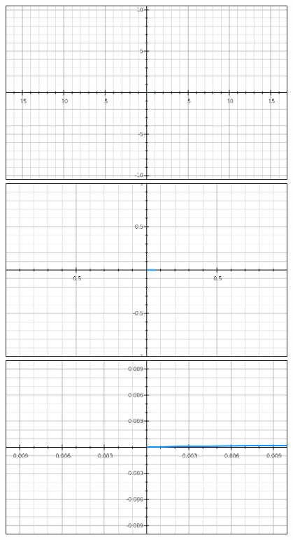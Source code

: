 \documentclass[aspectratio=149]{beamer}
\begin{document}
\begin{frame}
\begin{columns}
\begin{column}{0.5\textwidth}
			\end{column}
			\begin{column}{0.5\textwidth}
				\begin{figure}
					\begin{overprint}
						\includegraphics[width=\textwidth]{pres_img/f1.png}
						\onslide<3>\includegraphics[width=\textwidth]{pres_img/f2.png}
						\onslide<4>\includegraphics[width=\textwidth]{pres_img/f3.png}

\end{overprint}
\end{figure}
\end{column}
\end{columns}
\end{frame}
\end{document}
